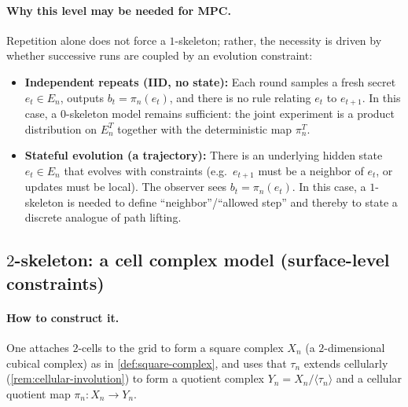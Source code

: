 \documentclass[11pt,a4paper]{article}
\theoremstyle{definition}
\theoremstyle{remark}
\begin{document}
\paragraph{Why this level may be needed for MPC.}
Repetition alone does not force a \(1\)-skeleton; rather, the necessity is driven by whether successive runs are coupled by an evolution constraint:
\begin{itemize}
  \item \textbf{Independent repeats (IID, no state):} Each round samples a fresh secret \(e_t\in E_n\), outputs \(b_t=\pi_n(e_t)\), and there is no rule relating \(e_t\) to \(e_{t+1}\). In this case, a \(0\)-skeleton model remains sufficient: the joint experiment is a product distribution on \(E_n^T\) together with the deterministic map \(\pi_n^T\).
  \item \textbf{Stateful evolution (a trajectory):} There is an underlying hidden state \(e_t\in E_n\) that evolves with constraints (e.g.\ \(e_{t+1}\) must be a neighbor of \(e_t\), or updates must be local). The observer sees \(b_t=\pi_n(e_t)\). In this case, a \(1\)-skeleton is needed to define ``neighbor''/``allowed step'' and thereby to state a discrete analogue of path lifting.
\end{itemize}

\subsection{\(2\)-skeleton: a cell complex model (surface-level constraints)}
\label{sec:sk2}

\paragraph{How to construct it.}
One attaches \(2\)-cells to the grid to form a square complex \(X_n\) (a \(2\)-dimensional cubical complex) as in \cref{def:square-complex}, and uses that \(\tau_n\) extends cellularly (\cref{rem:cellular-involution}) to form a quotient complex \(Y_n=X_n/\langle\tau_n\rangle\) and a cellular quotient map \(\pi_n:X_n\to Y_n\).
\end{document}
